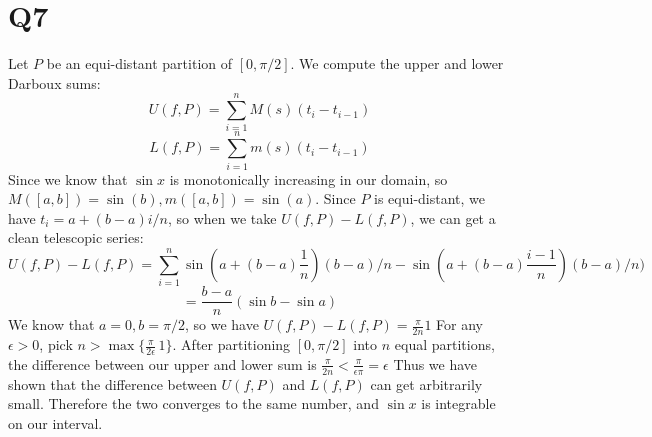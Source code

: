 \documentclass[12pt]{article}
\begin{document}
\section{Q7}
Let $P$ be an equi-distant partition of $[0, \pi/2]$. We compute the upper and lower Darboux sums:
$$U(f, P) = \sum_{i=1}^n M(s)(t_i-t_{i-1})$$
$$L(f, P) = \sum_{i=1}^n m(s)(t_i-t_{i-1})$$
Since we know that $\sin x$ is monotonically increasing in our domain, so $M([a,b]) = \sin(b), m([a,b]) = \sin(a)$.
\newline
Since $P$ is equi-distant, we have $t_i = a + (b-a)i/n$, so when we take $U(f,P)-L(f,P)$, we can get a clean telescopic series:
$$U(f,P)-L(f,P) = \sum_{i=1}^n \sin(a + (b-a)\frac{1}{n})(b-a)/n - \sin(a + (b-a)\frac{i-1}{n})(b-a)/n)$$
$$= \frac{b-a}{n}(\sin b - \sin a)$$
We know that $a=0, b = \pi/2$, so we have $U(f,P)-L(f,P) = \frac{\pi}{2n}1$
\newline
For any $\epsilon > 0$, pick $n > \max \{\frac{\pi}{2\epsilon}\, 1\}$. After partitioning $[0, \pi/2]$ into $n$ equal partitions, the difference between our upper and lower sum is $\frac{\pi}{2n} < \frac{\pi}{\epsilon \pi} = \epsilon$
Thus we have shown that the difference between $U(f,P)$ and $L(f,P)$ can get arbitrarily small. Therefore the two converges to the same number, and $\sin x$ is integrable on our interval.
\end{document}
